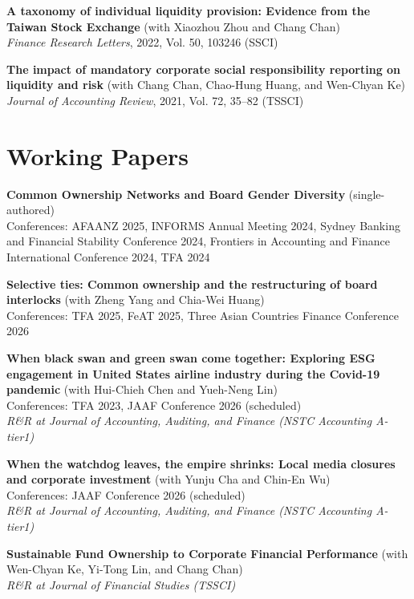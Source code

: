 \documentclass[
  english,
  margin]{res}
\begin{document}
\begin{resume}
\textbf{A taxonomy of individual liquidity provision: Evidence from the
Taiwan Stock Exchange} (with Xiaozhou Zhou and Chang Chan)\\
\emph{Finance Research Letters}, 2022, Vol. 50, 103246 (SSCI)

\textbf{The impact of mandatory corporate social responsibility
reporting on liquidity and risk} (with Chang Chan, Chao-Hung Huang, and
Wen-Chyan Ke)\\
\emph{Journal of Accounting Review}, 2021, Vol. 72, 35--82 (TSSCI)

\section{\texorpdfstring{Working
\newline Papers}{Working Papers}}\label{working-papers}

\textbf{Common Ownership Networks and Board Gender Diversity}
(single-authored)\\
Conferences: AFAANZ 2025, INFORMS Annual Meeting 2024, Sydney Banking
and Financial Stability Conference 2024, Frontiers in Accounting and
Finance International Conference 2024, TFA 2024

\textbf{Selective ties: Common ownership and the restructuring of board
interlocks} (with Zheng Yang and Chia-Wei Huang)\\
Conferences: TFA 2025, FeAT 2025, Three Asian Countries Finance
Conference 2026

\textbf{When black swan and green swan come together: Exploring ESG
engagement in United States airline industry during the Covid-19
pandemic} (with Hui-Chieh Chen and Yueh-Neng Lin)\\
Conferences: TFA 2023, JAAF Conference 2026 (scheduled)\\
\emph{R\&R at Journal of Accounting, Auditing, and Finance (NSTC
Accounting A-tier1)}

\textbf{When the watchdog leaves, the empire shrinks: Local media
closures and corporate investment} (with Yunju Cha and Chin-En Wu)\\
Conferences: JAAF Conference 2026 (scheduled)\\
\emph{R\&R at Journal of Accounting, Auditing, and Finance (NSTC
Accounting A-tier1)}

\textbf{Sustainable Fund Ownership to Corporate Financial Performance}
(with Wen-Chyan Ke, Yi-Tong Lin, and Chang Chan)\\
\emph{R\&R at Journal of Financial Studies (TSSCI)}


\end{resume}
\end{document}
